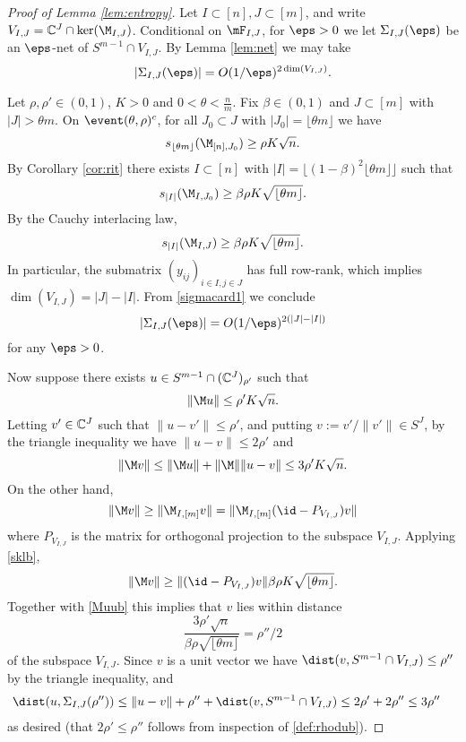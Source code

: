 \documentclass[aop,preprint]{imsart}
\theoremstyle{plain}
\theoremstyle{definition}
\theoremstyle{remark}
\numberwithin{equation}{section}
\numberwithin{theorem}{section}
\def \lf {\lfloor}
\def \rf {\rfloor}
\begin{document}
\begin{proof}[Proof of Lemma \ref{lem:entropy}]
Let $I\subset [n], J\subset[m]$, and write $V_{I,J} = \C^J\cap \ker(\M_{I,J})$.
Conditional on $\mF_{I,J}$, for $\eps>0$ we let $\Sigma_{I,J}(\eps)$ be an $\eps$-net of $S^{m-1}\cap V_{I,J}$. 
By Lemma \ref{lem:net} we may take
\begin{equation}	\label{sigmacard1}
|\Sigma_{I,J}(\eps)| = O(1/\eps)^{2\dim(V_{I,J})}.
\end{equation}

Let $\rho,\rho'\in (0,1)$, $K>0$ and $0<\theta< \frac nm$.
Fix $\beta\in (0,1)$ and $J\subset [m]$ with $|J|>\theta m$.
On $\event(\theta,\rho)^c$, for all $J_0\subset J$ with $|J_0|=\lf \theta m\rf$ we have
\[
s_{\lf \theta m\rf}(\M_{[n], J_0})\ge \rho K\sqrt{n}.
\]
By Corollary \ref{cor:rit} there exists $I\subset [n]$ with $|I|=\lf (1-\beta)^2 \lf \theta m\rf\rf$ such that 
\[
s_{|I|}(\M_{I, J_0})\ge \beta \rho K\sqrt{\lf \theta m\rf}.
\]
By the Cauchy interlacing law,
\begin{equation}	\label{sklb}
s_{|I|}(\M_{I, J}) \ge \beta \rho K\sqrt{\lf \theta m\rf}.
\end{equation}
In particular, the submatrix $(y_{ij})_{i\in I,j\in J}$ has full row-rank, which implies $\dim(V_{I,J}) = |J| - |I|$.
From \eqref{sigmacard1} we conclude
\begin{equation}	\label{sigmacard2}
|\Sigma_{I,J}(\eps)| = O(1/\eps)^{2(|J|-|I|)}
\end{equation}
for any $\eps>0$.

Now suppose there exists $u\in S^{m-1}\cap ({\mathbb C}^J)_{\rho'}$ such that
\begin{equation}	
\|\M u\|\le \rho'K\sqrt{n}.
\end{equation}
Letting $v'\in {\mathbb C}^J$ such that $\|u-v'\|\le \rho'$, and putting $v:=v'/\|v'\|\in S^J$, by the triangle inequality we have $\|u-v\|\le 2\rho'$ and
\begin{equation}	\label{Muub}
\|\M v\|\le \|\M u\|+\|\M \|\|u-v\| \le 3\rho'K\sqrt{n}.
\end{equation}
On the other hand,
\[
\|\M  v\| \ge \|\M_{I, [m]}v\| = \|\M_{I, [m]}(\id -P_{V_{I,J}})v\|
\]
where $P_{V_{I,J}}$ is the matrix for orthogonal projection to the subspace $V_{I,J}$. 
Applying \eqref{sklb}, 
\[
\|\M  v\| \ge \|(\id - P_{V_{I,J}})v\| \beta \rho K\sqrt{\lf \theta m\rf}.
\]
Together with \eqref{Muub} this implies that $v$ lies within distance
\begin{equation}
\frac{3\rho' \sqrt{n}}{\beta \rho \sqrt{\lf \theta m\rf}}  =\rho''/2
\end{equation}
of the subspace $V_{I,J}$. Since $v$ is a unit vector we have $\dist(v,S^{m-1}\cap V_{I,J})\le \rho''$ by the triangle inequality, and
\begin{align*}
\dist(u,\Sigma_{I,J}(\rho'')) &\le \|u-v\|+\rho''+ \dist(v, S^{m-1}\cap V_{I,J}) \le 2\rho' + 2\rho'' \le 3\rho''
\end{align*}
as desired (that $2\rho'\le \rho''$ follows from inspection of \eqref{def:rhodub}).


\end{proof}
\end{document}
